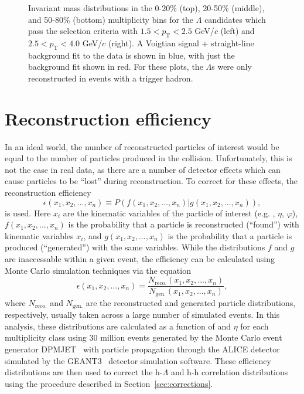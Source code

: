 \begin{figure}[ht]
\begin{minipage}{0.48\textwidth}
	\end{minipage}
	\caption{Invariant mass distributions in the 0-20\% (top), 20-50\% (middle), and 50-80\% (bottom) multiplicity bins for the $\Lambda$ candidates which pass the selection criteria with $1.5 < p_{\text{T}} < 2.5$ GeV/$c$ (left) and $2.5 < p_{\text{T}} < 4.0$ GeV/$c$ (right). A Voigtian signal + straight-line background fit to the data is shown in blue, with just the background fit shown in red. For these plots, the $\Lambda$s were only reconstructed in events with a trigger hadron.} 
	\label{fig:lambda_mass}
\end{figure}

\clearpage

\section{Reconstruction efficiency}
\label{sec:reconstruction_efficiency}

In an ideal world, the number of reconstructed particles of interest would be equal to the number of particles produced in the collision. Unfortunately, this is not the case in real data, as there are a number of detector effects which can cause particles to be ``lost'' during reconstruction. To correct for these effects, the reconstruction efficiency
%
\begin{equation}
	\epsilon(x_1, x_2, ..., x_n) \equiv P(f(x_1, x_2, ..., x_n) | g(x_1, x_2, ..., x_n)),
	\label{eq:efficiency_th}
\end{equation}
%
is used. Here $x_i$ are the kinematic variables of the particle of interest (e.g. \pt, $\eta$, $\varphi$), $f(x_1, x_2, ..., x_n)$ is the probability that a particle is reconstructed (``found'') with kinematic variables $x_i$, and $g(x_1, x_2, ..., x_n)$ is the probability that a particle is produced (``generated'') with the same variables. While the distributions $f$ and $g$ are inaccessable within a given event, the efficiency can be calculated using Monte Carlo simulation techniques via the equation
%
\begin{equation}
	\epsilon(x_1, x_2, ..., x_n) = \frac{N_{\text{reco.}}(x_1, x_2, ..., x_n)}{N_{\text{gen.}}(x_1, x_2, ..., x_n)},
	\label{eq:efficiency_exp}
\end{equation}
%
where $N_{\text{reco.}}$ and $N_{\text{gen.}}$ are the reconstructed and generated particle distributions, respectively, usually taken across a large number of simulated events. In this analysis, these distributions are calculated as a function of \pt and $\eta$ for each multiplicity class using 30 million events generated by the Monte Carlo event generator DPMJET~\cite{DPMJET} with particle propagation through the ALICE detector simulated by the GEANT3~\cite{GEANT} detector simulation software. These efficiency distributions are then used to correct the h-$\Lambda$ and h-h correlation distributions using the procedure described in Section~\ref{sec:corrections}.

